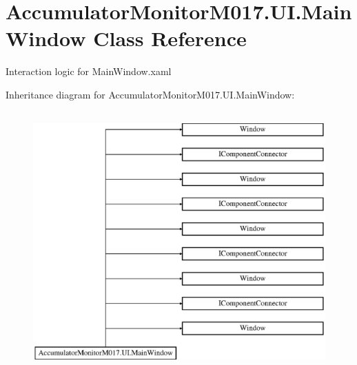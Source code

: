 \hypertarget{class_accumulator_monitor_m017_1_1_u_i_1_1_main_window}{}\section{Accumulator\+Monitor\+M017.\+U\+I.\+Main\+Window Class Reference}
\label{class_accumulator_monitor_m017_1_1_u_i_1_1_main_window}


Interaction logic for Main\+Window.\+xaml  


Inheritance diagram for Accumulator\+Monitor\+M017.\+U\+I.\+Main\+Window\+:\begin{figure}[H]
\begin{center}
\leavevmode
\includegraphics[height=10.000000cm]{class_accumulator_monitor_m017_1_1_u_i_1_1_main_window}
\end{center}
\end{figure}
